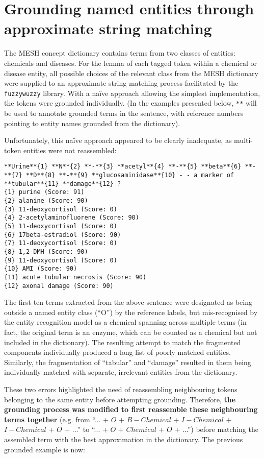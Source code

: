 \documentclass[10pt, oneside]{article}
\begin{document}
\section{Grounding named entities through approximate string matching} \label{sec:grounding}

The MESH concept dictionary contains terms from two classes of entities: chemicals and diseases. For the lemma of each tagged token within a chemical or disease entity, all possible choices of the relevant class from the MESH dictionary were supplied to an approximate string matching process facilitated by the \verb|fuzzywuzzy| \cite{fuzzywuzzy} library. With a na\"ive approach allowing the simplest implementation, the tokens were grounded individually. (In the examples presented below, \verb|**| will be used to annotate grounded terms in the sentence, with reference numbers pointing to entity names grounded from the dictionary).

Unfortunately, this na\"ive approach appeared to be clearly inadequate, as multi-token entities were not reassembled:

\begin{lstlisting}[breaklines]
**Urine**{1} **N**{2} **-**{3} **acetyl**{4} **-**{5} **beta**{6} **-**{7} **D**{8} **-**{9} **glucosaminidase**{10} - - a marker of **tubular**{11} **damage**{12} ?
{1} purine (Score: 91)
{2} alanine (Score: 90)
{3} 11-deoxycortisol (Score: 0)
{4} 2-acetylaminofluorene (Score: 90)
{5} 11-deoxycortisol (Score: 0)
{6} 17beta-estradiol (Score: 90)
{7} 11-deoxycortisol (Score: 0)
{8} 1,2-DMH (Score: 90)
{9} 11-deoxycortisol (Score: 0)
{10} AMI (Score: 90)
{11} acute tubular necrosis (Score: 90)
{12} axonal damage (Score: 90)
\end{lstlisting}

The first ten terms extracted from the above sentence were designated as being outside a named entity class (``O'') by the reference labels, but mis-recognised by the entity recognition model as a chemical spanning across multiple terms (in fact, the original term is an enzyme, which can be counted as a chemical but not included in the dictionary). The resulting attempt to match the fragmented components individually produced a long list of poorly matched entities. Similarly, the fragmentation of ``tabular'' and ``damage'' resulted in them being individually matched with separate, irrelevant entities from the dictionary.

These two errors highlighted the need of reassembling neighbouring tokens belonging to the same entity before attempting grounding. Therefore, \textbf{the grounding process was modified to first reassemble these neighbouring terms together} (e.g. from ``... + $O$ + $B-Chemical$ + $I-Chemical$ + $I-Chemical$ +  $O$ + ...'' to ``... + $O$ + $Chemical$ +  $O$ + ...'') before matching the assembled term with the best approximation in the dictionary. The previous grounded example is now:
\end{document}
